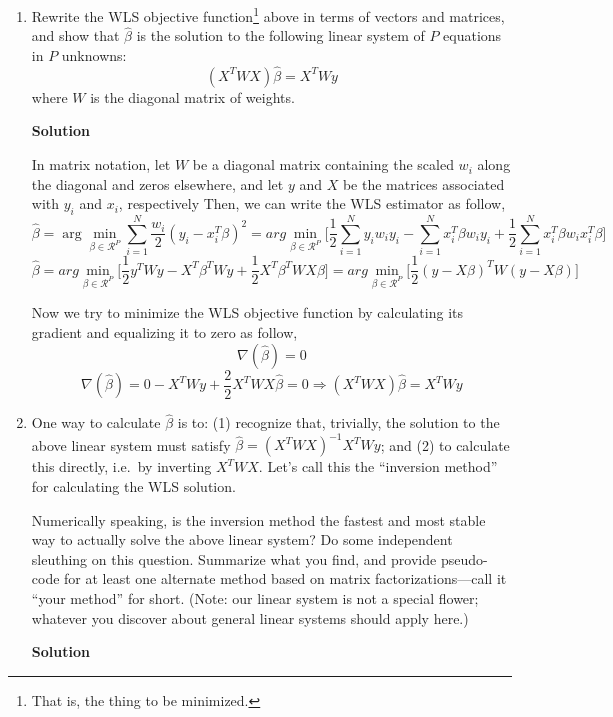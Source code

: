 \documentclass[11 pt]{article}
\begin{document}
\begin{enumerate}[label=(\Alph*)]

\item Rewrite the WLS objective function\footnote{That is, the thing to be minimized.} above in terms of vectors and matrices, and show that $\hat \beta$ is the solution to the following linear system of $P$ equations in $P$ unknowns:
$$(X^T W X) \hat \beta = X^T W y $$ where $W$ is the diagonal matrix of weights.

\vspace{2mm}
\textbf{Solution}

In matrix notation, let  $W$ be a diagonal matrix containing the scaled  $w_i$  along the diagonal and zeros elsewhere, and let $y$ and $X$ be the matrices associated with $y_i $ and $x_i $, respectively Then, we can write the WLS estimator as follow,
$$\hat{\beta} = \arg \min_{\beta \in \mathcal{R}^P} \sum_{i=1}^N \frac{w_i}{2}(y_i - x_i^T \beta)^2 
=arg \min_{\beta \in \mathcal{R}^P}\Bigg[ \frac{1}{2}\sum_{i=1}^N y_iw_iy_i -\sum_{i=1}^N x_i^T\beta w_iy_i + \frac{1}{2}\sum_{i=1}^N x_i^T\beta w_ix_i^T\beta\Bigg]$$
$$\hat{\beta} =arg \min_{\beta \in \mathcal{R}^P}\bigg[\frac{1}{2}y^TWy-X^T\beta^T Wy+\frac{1}{2}X^T\beta^T WX\beta\bigg]=arg \min_{\beta \in \mathcal{R}^P}\bigg[\frac{1}{2}(y-X\beta)^TW(y-X\beta)\bigg]$$

Now we try to minimize the WLS objective function by calculating its gradient and equalizing it to zero as follow,
$$\nabla(\hat{\beta})=0$$
$$\nabla(\hat{\beta})=0-X^TWy+\frac{2}{2}X^TWX\hat \beta=0 \Rightarrow (X^T W X) \hat \beta = X^T W y $$

\newpage
\item One way to calculate $\hat{\beta}$ is to: (1) recognize that, trivially, the solution to the above linear system must satisfy $\hat \beta = (X^T W X)^{-1} X^T W y$; and (2) to calculate this directly, i.e.~by inverting $X^T W X$.  Let's call this the ``inversion method'' for calculating the WLS solution.

Numerically speaking, is the inversion method the fastest and most stable way to actually solve the above linear system?  Do some independent sleuthing on this question.  Summarize what you find, and provide pseudo-code for at least one alternate method based on matrix factorizations---call it ``your method'' for short.  (Note: our linear system is not a special flower; whatever you discover about general linear systems should apply here.)

\vspace{2mm}
\textbf{Solution}


\end{enumerate}
\end{document}
